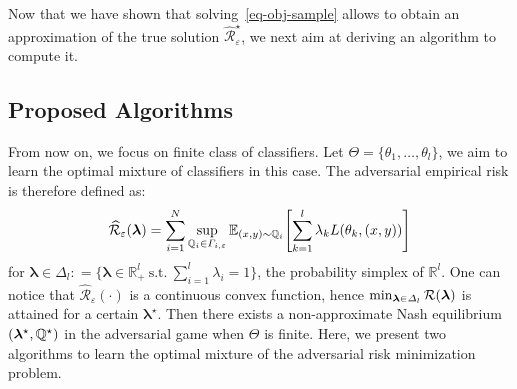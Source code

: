 Now that we have shown that solving~\eqref{eq-obj-sample} allows to obtain an approximation of the true solution $\widehat{\mathcal{R}}_{\varepsilon}^{\star}$, we next aim at deriving an algorithm to compute it. 

\subsection{Proposed Algorithms}
\label{sec:proposed-algo}
From now on, we focus on finite class of classifiers. Let $\Theta = \{\theta_1,\dots,\theta_l\}$, we aim to learn the optimal mixture of classifiers in this case. The adversarial  empirical risk  is therefore defined as:
\begin{align*}
    \widehat{\mathcal{R}}_{\varepsilon}(\bm{\lambda})= \sum_{i=1}^\numsamples\sup_{\QQ_i\in\Gamma_{i,\varepsilon}}\mathbb{E}_{(x,y)\sim \QQ_i}\left[\sum_{k=1}^l \lambda_k \loss(\theta_k,(x,y))\right]
\end{align*}
for $\bm{\lambda}\in\Delta_l: = \{\bm{\lambda}\in\mathbb{R}_+^l~\mathrm{s.t.}~\sum_{i=1}^l\lambda_i=1\}$, the probability simplex of $\mathbb{R}^l$. One can notice that $ \widehat{\mathcal{R}}_{\varepsilon}(\cdot)$ is a continuous convex function, hence $\min_{\bm{\lambda}\in\Delta_l}\mathcal{R}(\bm{\lambda})$ is attained for a certain $\bm{\lambda}^\star$. Then there exists a non-approximate Nash equilibrium $(\bm{\lambda}^\star,\mathbb{Q}^\star)$ in the adversarial game when $\Theta$ is finite. Here, we present two algorithms to learn the optimal mixture of the adversarial risk minimization problem.


